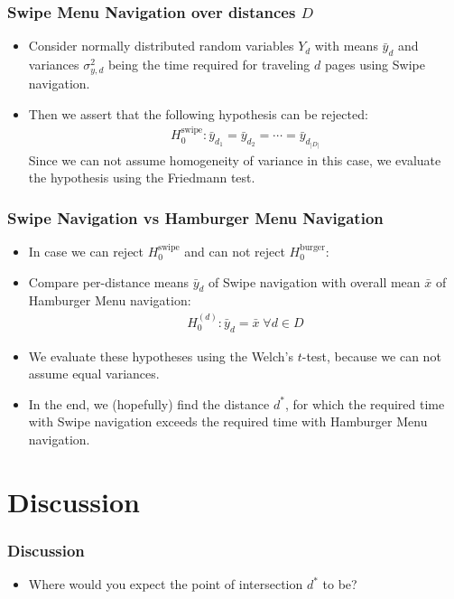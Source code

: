 \documentclass{beamer}
\begin{document}
\begin{frame}
  \frametitle{Swipe Menu Navigation over distances $D$}
  \begin{itemize}
    \item  Consider normally
      distributed random variables $Y_d$ with means $\bar y_d$ and variances
      $\sigma_{y,d}^2$ being the time required for traveling $d$ pages using
      Swipe navigation.
    \item Then we assert that the following hypothesis can be rejected:
      \begin{align*}
        H_0^\text{swipe}: \bar y_{d_1} = \bar y_{d_2} = \cdots = \bar y_{d_{|D|}}
      \end{align*}
      Since we can not assume homogeneity of variance in this case,
      we evaluate the hypothesis using the Friedmann test.
  \end{itemize}
\end{frame}

\begin{frame}
  \frametitle{Swipe Navigation vs Hamburger Menu Navigation}
  \begin{itemize}
    \item In case we can reject $H_0^\text{swipe}$ and can not reject $H_0^\text{burger}$:
    \item Compare per-distance means $\bar y_d$ of Swipe navigation
      with overall mean $\bar x$ of Hamburger Menu navigation:
      \begin{align*}
        H_0^{(d)} : \bar y_d = \bar x \;\forall d \in D
      \end{align*}
    \item We evaluate these hypotheses using the Welch's $t$-test, because we
      can not assume equal variances.
    \item In the end, we (hopefully) find the distance $d^*$, for which the
      required time with Swipe navigation exceeds the required time with
      Hamburger Menu navigation.
  \end{itemize}
\end{frame}

\section{Discussion}
\begin{frame}
  \frametitle{Discussion}
  \begin{itemize}
    \item Where would you expect the point of intersection $d^*$ to be?
  \end{itemize}
\end{frame}
\end{document}
